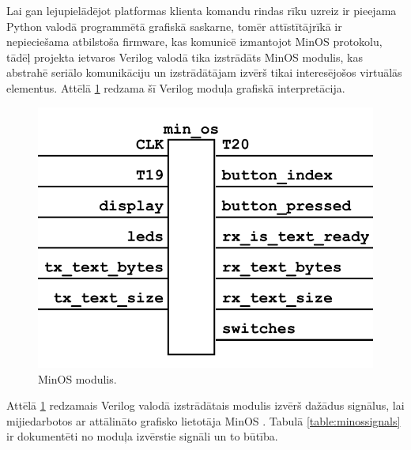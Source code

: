 Lai gan lejupielādējot platformas klienta komandu rindas rīku uzreiz ir pieejama
Python valodā programmētā grafiskā saskarne, tomēr attīstītājrīkā ir
nepieciešama atbilstoša \gls{firmware}, kas komunicē izmantojot MinOS protokolu,
tādēļ projekta ietvaros Verilog valodā tika izstrādāts MinOS modulis, kas
abstrahē seriālo komunikāciju un izstrādātājam izvērš tikai interesējošos
virtuālās  elementus. Attēlā \ref{fig:minos} redzama šī Verilog moduļa
grafiskā interpretācija. 

\begin{figure}[H]
    \includegraphics[width=0.7\linewidth]{assets/min-os-grey.png}
    \centering
    \caption{MinOS  modulis.}
    \label{fig:minos}
\end{figure}

Attēlā \ref{fig:minos} redzamais Verilog valodā izstrādātais modulis izvērš
dažādus signālus, lai mijiedarbotos ar attālināto grafisko lietotāja MinOS
. Tabulā \ref{table:minossignals} ir dokumentēti
no moduļa izvērstie signāli un to būtība.

